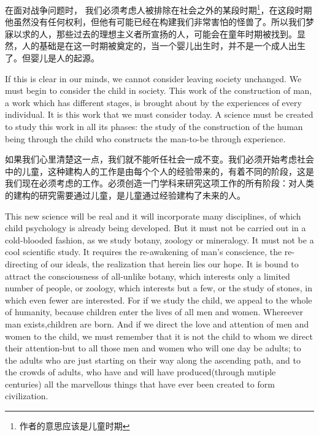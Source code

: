 \documentclass[lang=cn,10pt]{elegantbook}
\begin{document}
在面对战争问题时， 我们必须考虑人被排除在社会之外的某段时期\footnote{作者的意思应该是儿童时期}，在这段时期他虽然没有任何权利，但他有可能已经在构建我们非常害怕的怪兽了。所以我们梦寐以求的人，那些过去的理想主义者所宣扬的人，可能会在童年时期被找到。显然，人的基础是在这一时期被奠定的，当一个婴儿出生时，并不是一个成人出生了。但婴儿是人的起源。

If this is clear in our minds, we cannot consider leaving society unchanged. We must begin to consider the child in society. This work of the construction of man, a work which has different stages, is brought about by the experiences of every individual. It is this work that we must consider today. A science must be created to study this work in all its phases: the study of the construction of the human being through the child who constructs the man-to-be through experience.

如果我们心里清楚这一点，我们就不能听任社会一成不变。我们必须开始考虑社会中的儿童，这种建构人的工作是由每个个人的经验带来的，有着不同的阶段，这是我们现在必须考虑的工作。必须创造一门学科来研究这项工作的所有阶段：对人类的建构的研究需要通过儿童，是儿童通过经验建构了未来的人。

This new science will be real and it will incorporate many disciplines, of which child psychology is already being developed. But it must not be carried out in a cold-blooded fashion, as we study botany, zoology or mineralogy. It must not be a cool scientific study. It requires the re-awakening of man's conscience, the re-directing of our ideals, the realization that herein lies our hope. It is bound to attract the consciousness of all-unlike botany, which interests only a limited number of people, or zoology, which interests but a few, or the study of stones, in which even fewer are interested. For if we study the child, we appeal to the whole of humanity, because children enter the lives of all men and women. Whereever man exists,children are born. And if we direct the love and attention of men and women to the child, we must remember that it is not the child to whom we direct their attention-but to all those men and women who will one day be adults; to the adults who are just starting on their way along the ascending path, and to the crowds of adults, who have and will have produced(through mutiple centuries) all the marvellous things that have ever been created to form civilization.
\end{document}

